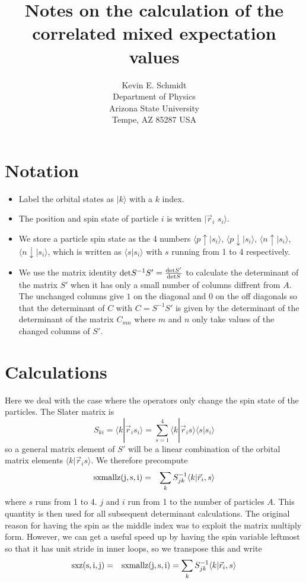 \documentclass[12pt]{article}
\begin{document}
\title{Notes on the calculation of the correlated mixed expectation
values}
\author{
Kevin E. Schmidt\\
Department of Physics\\
Arizona State University\\
Tempe, AZ 85287 USA\\
}
\maketitle
\section{Notation}
\begin{itemize}
\item
Label the orbital states as $|k\rangle$ with a $k$ index.
\item
The position and spin state
of particle $i$ is written $|\vec r_i$ $s_i\rangle$.
\item
We store a particle
spin state as the 4 numbers
$\langle p\uparrow|s_i\rangle$,
$\langle p\downarrow|s_i\rangle$,
$\langle n\uparrow|s_i\rangle$,
$\langle n\downarrow|s_i\rangle$, which is written as
$\langle s|s_i\rangle$ with $s$ running from 1 to 4 respectively.
\item
We use the matrix identity 
${\rm det} S^{-1}S' = \frac{{\rm det} S'}{{\rm det}S}$ to calculate
the determinant of the matrix $S'$ when it has only a small number
of columns diffrent from $A$. The unchanged columns give $1$ on the
diagonal and $0$ on the off diagonals so that the determinant of $C$
with $C=S^{-1}S'$ is given by the determinant of the determinant
of the matrix $C_{mn}$ where $m$ and $n$ only take values of the changed
columns of $S'$.
\end{itemize}

\section{Calculations}
Here we deal with the case where the operators only change the spin state
of the particles. The Slater matrix is
\begin{equation}
S_{ki} = \langle k|\vec r_i s_i\rangle =
\sum_{s=1}^4\langle k|\vec r_i s\rangle \langle s|s_i\rangle
\end{equation}
so a general matrix element of $S'$ will be a linear combination of
the orbital matrix elements
$\langle k|\vec r_i s\rangle$. We therefore precompute
\begin{eqnarray}
{\rm sxmallz(j,s,i)} &=& \sum_k S^{-1}_{jk} \langle k|\vec r_i, s\rangle
\end{eqnarray}
where $s$ runs from 1 to 4. $j$ and $i$ run from 1 to the number of
particles $A$. This quantity is then used for all subsequent determinant
calculations. The original reason for having the spin as the middle index
was to exploit the matrix multiply form.
However, we can get a useful speed up by having the spin
variable leftmost so that it has unit stride in inner loops, so
we transpose this and write
\begin{eqnarray}
{\rm sxz(s,i,j)} &=&
{\rm sxmallz(j,s,i)} = \sum_k S^{-1}_{jk} \langle k|\vec r_i, s\rangle
\end{eqnarray}
\end{document}
